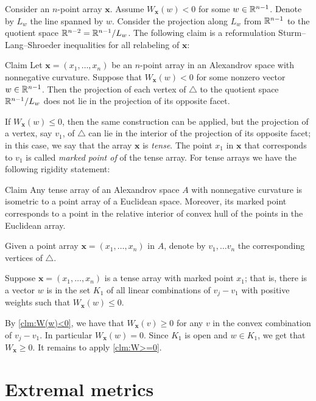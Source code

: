 \documentclass{article}
\begin{document}
Consider an $n$-point array $\bm{x}$.
Assume $W_{\bm{x}}(w)<0$ for some $w\in\mathbb{R}^{n-1}$.
Denote by $L_w$ the line spanned by $w$.
Consider the projection along $L_w$ from $\mathbb{R}^{n-1}$ to the quotient space $\RR^{n-2}\z=\RR^{n-1}/L_w$.
The following claim is a reformulation Sturm--Lang--Shroeder inequalities for all relabeling of $\bm{x}$:

\begin{thm}{Claim}\label{clm:W(w)<0}
Let $\bm{x}=(x_1,\dots,x_n)$ be an $n$-point array in an Alexandrov space with nonnegative curvature.
Suppose that $W_{\bm{x}}(w)<0$ for some nonzero vector $w\in\mathbb{R}^{n-1}$.
Then the projection of each vertex of $\triangle$ to the quotient space $\mathbb{R}^{n-1}/L_w$ does not lie in the projection of its opposite facet.
\end{thm}

If $W_{\bm{x}}(w)\le0$, then the same construction can be applied, but the projection of a vertex, say $v_1$, of $\triangle$ can lie in the interior of the projection of its opposite facet;
in this case, we say that the array $\bm{x}$ is \emph{tense}.
The point $x_1$ in $\bm{x}$ that corresponds to $v_1$ is called \emph{marked point of} of the tense array.
For tense arrays we have the following rigidity statement:

\begin{thm}{Claim}\label{clm:W(w)==0}
Any tense array of an Alexandrov space $A$ with nonnegative curvature is isometric to a point array of a Euclidean space.
Moreover, its marked point corresponds to a point in the relative interior of convex hull of the points in the Euclidean array.
\end{thm}

Given a point array $\bm{x}=(x_1,\dots,x_n)$ in $A$, denote by $v_1,\dots v_n$ the corresponding vertices of $\triangle$.

Suppose $\bm{x}=(x_1,\dots,x_n)$ is a tense array with marked point $x_1$;
that is, there is a vector $w$ is in the set $K_1$ of all linear combinations of $v_j-v_1$ with positive weights such that $W_{\bm{x}}(w)\le 0$. 

By \ref{clm:W(w)<0}, we have that $W_{\bm{x}}(v)\ge 0$ for any $v$ in the convex combination of $v_j-v_1$.
In particular $W_{\bm{x}}(w)=0$.
Since $K_1$ is open and $w\in K_1$, we get that $W_{\bm{x}}\ge 0$.
It remains to apply \ref{clm:W>=0}.
\qeds

\section{Extremal metrics}\label{sec:ext}
\end{document}
